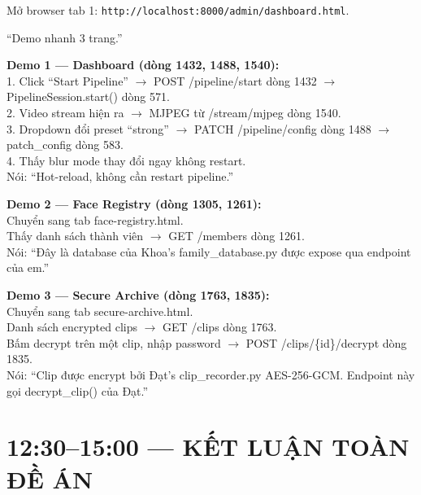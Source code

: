 \documentclass[12pt, a4paper]{article}
\begin{document}
\begin{doact}
Mở browser tab 1: \texttt{http://localhost:8000/admin/dashboard.html}.
\end{doact}

\begin{say}
``Demo nhanh 3 trang.''
\end{say}

\begin{doact}
\textbf{Demo 1 --- Dashboard (dòng 1432, 1488, 1540):}\\
1. Click ``Start Pipeline'' $\to$ POST /pipeline/start dòng 1432 $\to$ PipelineSession.start() dòng 571.\\
2. Video stream hiện ra $\to$ MJPEG từ /stream/mjpeg dòng 1540.\\
3. Dropdown đổi preset ``strong'' $\to$ PATCH /pipeline/config dòng 1488 $\to$ patch\_config dòng 583.\\
4. Thấy blur mode thay đổi ngay không restart.\\
Nói: ``Hot-reload, không cần restart pipeline.''
\end{doact}

\begin{doact}
\textbf{Demo 2 --- Face Registry (dòng 1305, 1261):}\\
Chuyển sang tab face-registry.html.\\
Thấy danh sách thành viên $\to$ GET /members dòng 1261.\\
Nói: ``Đây là database của Khoa's family\_database.py được expose qua endpoint của em.''
\end{doact}

\begin{doact}
\textbf{Demo 3 --- Secure Archive (dòng 1763, 1835):}\\
Chuyển sang tab secure-archive.html.\\
Danh sách encrypted clips $\to$ GET /clips dòng 1763.\\
Bấm decrypt trên một clip, nhập password $\to$ POST /clips/\{id\}/decrypt dòng 1835.\\
Nói: ``Clip được encrypt bởi Đạt's clip\_recorder.py AES-256-GCM. Endpoint này gọi decrypt\_clip() của Đạt.''
\end{doact}

\section{12:30--15:00 --- KẾT LUẬN TOÀN ĐỀ ÁN}
\end{document}
